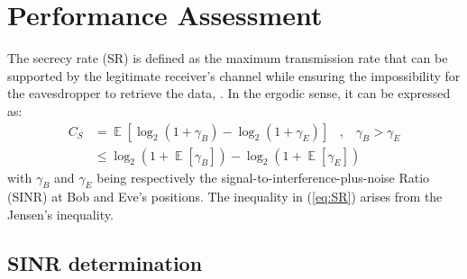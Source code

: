 \documentclass[conference]{IEEEtran}
\begin{document}

\section{Performance Assessment}
\label{sec:perf}
The secrecy rate (SR) is defined as the maximum transmission rate that can be supported by the legitimate receiver's channel while ensuring the impossibility for the eavesdropper to retrieve the data, \cite{TR_Tran_secrecy_capa}. In the ergodic sense, it can be expressed as:
\begin{equation}
\begin{split}
    C_S &=  \mathop{\mathbb{E}} \left[\log_2{\left(1+\gamma_B\right)} - \log_2{\left(1+\gamma_E\right)}\right] \; \; \; , \; \; \;  \gamma_B > \gamma_E \\
    &\leq   \log_2 \left( 1+ \mathop{\mathbb{E}}\left[\gamma_B\right] \right) - \log_2 \left( 1+ \mathop{\mathbb{E}}\left[\gamma_E \right] \right) 
    \end{split}
    \label{eq:SR}
\end{equation}
with $\gamma_B$ and $\gamma_E$ being respectively the signal-to-interference-plus-noise Ratio (SINR) at Bob and Eve's positions. The inequality in (\ref{eq:SR}) arises from the Jensen's inequality. 


\subsection{SINR determination}
\end{document}
